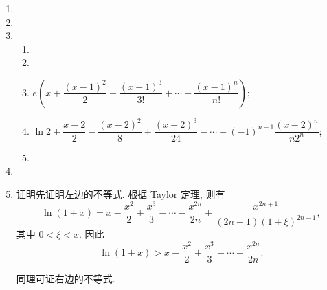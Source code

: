 \documentclass[a4paper, 11pt]{ctexart}
\begin{document}
\pagestyle{empty}
\begin{enumerate}
    \item %
    \item %
    \item %
        \begin{enumerate}[(1)]
            \item %
            \item %
            \item %
                $e\left(x + \dfrac{(x-1)^2}{2} + \dfrac{(x-1)^3}{3!} + \cdots + \dfrac{(x-1)^n}{n!}\right)$;
            \item %
                $\ln2 + \dfrac{x-2}{2} - \dfrac{(x-2)^2}{8} + \dfrac{(x-2)^3}{24} - \cdots + (-1)^{n-1}\dfrac{(x-2)^n}{n2^n}$;
            \item %
        \end{enumerate}
    \item %
    \item %
        {\heiti 证明}\quad 先证明左边的不等式. 根据 Taylor 定理, 则有
        \[
            \ln(1 + x) = x - \frac{x^2}{2} + \frac{x^3}{3} - \cdots - \frac{x^{2n}}{2n} + \frac{x^{2n+1}}{(2n+1)(1+\xi)^{2n+1}},   
        \]
        其中 $0 < \xi < x$. 因此
        \[
            \ln(1 + x) > x - \frac{x^2}{2} + \frac{x^3}{3} - \cdots - \frac{x^{2n}}{2n}. 
        \]

        同理可证右边的不等式.
\end{enumerate}
\end{document}
